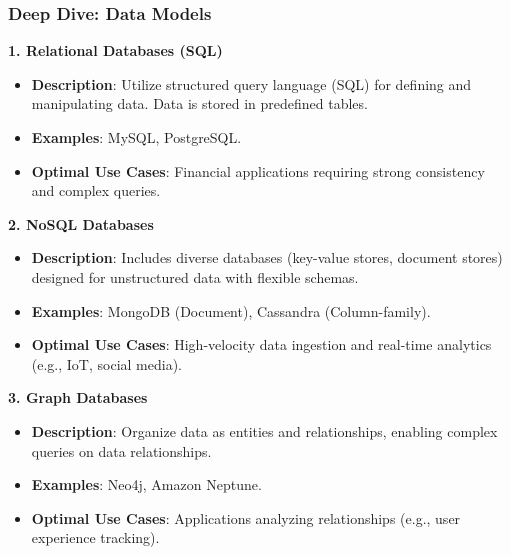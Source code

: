 \documentclass[aspectratio=169]{beamer}
\begin{document}
\begin{frame}[fragile]
    \frametitle{Deep Dive: Data Models}
    
    \textbf{1. Relational Databases (SQL)}
    \begin{itemize}
        \item \textbf{Description}: Utilize structured query language (SQL) for defining and manipulating data. 
              Data is stored in predefined tables.
        \item \textbf{Examples}: MySQL, PostgreSQL.
        \item \textbf{Optimal Use Cases}: Financial applications requiring strong consistency and complex queries.
    \end{itemize}
    
    \textbf{2. NoSQL Databases}
    \begin{itemize}
        \item \textbf{Description}: Includes diverse databases (key-value stores, document stores) designed for 
              unstructured data with flexible schemas.
        \item \textbf{Examples}: MongoDB (Document), Cassandra (Column-family).
        \item \textbf{Optimal Use Cases}: High-velocity data ingestion and real-time analytics (e.g., IoT, social media).
    \end{itemize}
    
    \textbf{3. Graph Databases}
    \begin{itemize}
        \item \textbf{Description}: Organize data as entities and relationships, enabling complex queries on data 
              relationships.
        \item \textbf{Examples}: Neo4j, Amazon Neptune.
        \item \textbf{Optimal Use Cases}: Applications analyzing relationships (e.g., user experience tracking).
    \end{itemize}
\end{frame}
\end{document}
